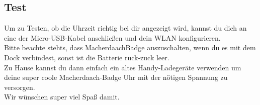 \documentclass{article}
\begin{document}
\subsection{Test}

Um zu Testen, ob die Uhrzeit richtig bei dir angezeigt wird, kannst du dich an eine der Micro-USB-Kabel anschließen und dein WLAN konfigurieren.\\

Bitte beachte stehts, dass MacherdaachBadge auszuschalten, wenn du es mit dem Dock verbindest, sonst ist die Batterie ruck-zuck leer.\\

Zu Hause kannst du dann einfach ein altes Handy-Ladegeräte verwenden um deine super coole Macherdaach-Badge Uhr mit der nötigen Spannung zu versorgen.\\

Wir wünschen super viel Spaß damit.



\end{document}
